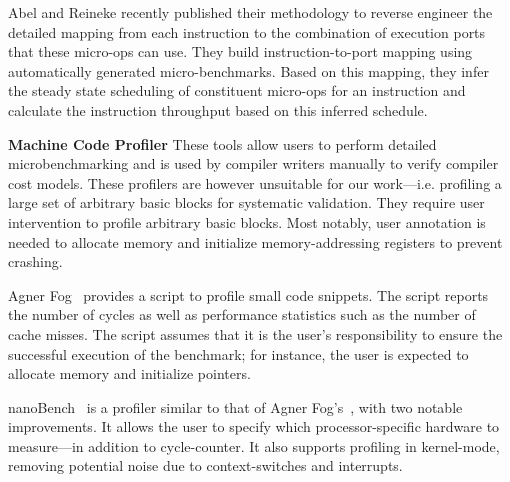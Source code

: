 Abel and Reineke\cite{uops} recently published their methodology
to reverse engineer the detailed mapping from each instruction to the
combination of execution ports
that these micro-ops can use.
They build instruction-to-port mapping using automatically generated micro-benchmarks.
Based on this mapping, they infer the steady state scheduling of constituent
micro-ops for an instruction and calculate the instruction throughput based on
this inferred schedule.

\textbf{Machine Code Profiler} These tools allow users to perform
detailed microbenchmarking and is used by compiler writers manually
to verify compiler cost models.
These profilers are however unsuitable for our work---i.e. profiling
a large set of arbitrary basic blocks for systematic validation.
They require user intervention to profile arbitrary basic blocks. Most notably,
user annotation is needed to allocate memory and
initialize memory-addressing registers to prevent crashing.

Agner Fog~\cite{agner} provides a script to profile small code snippets.
The script reports the number of cycles as well as performance statistics such as 
the number of cache misses.
The script assumes that it is the user's responsibility to ensure
the successful execution of the benchmark;
for instance, the user is expected to allocate memory and initialize pointers.

nanoBench~\cite{nanobench} is a profiler similar to that of Agner Fog's~\cite{agner},
with two notable improvements.
It allows the user to specify which processor-specific hardware
to measure---in addition to cycle-counter. It also supports profiling in kernel-mode,
removing potential noise due to context-switches and interrupts.


